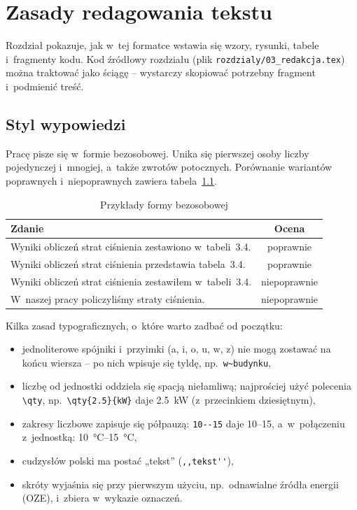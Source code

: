 \chapter{Zasady redagowania tekstu}
\label{chap:redakcja}

Rozdział pokazuje, jak w~tej formatce wstawia się wzory, rysunki, tabele
i~fragmenty kodu. Kod źródłowy rozdziału (plik
\texttt{rozdzialy/03\_redakcja.tex}) można traktować jako ściągę --
wystarczy skopiować potrzebny fragment i~podmienić treść.

\section{Styl wypowiedzi}
\label{sec:styl}

Pracę pisze się w~formie bezosobowej. Unika się pierwszej osoby liczby
pojedynczej i~mnogiej, a~także zwrotów potocznych. Porównanie wariantów
poprawnych i~niepoprawnych zawiera tabela~\ref{tab:styl}.

\begin{table}[htbp]
  \centering
  \caption{Przykłady formy bezosobowej}
  \label{tab:styl}
  \begin{tabularx}{\linewidth}{@{}Xc@{}}
    \toprule
    \textbf{Zdanie} & \textbf{Ocena} \\
    \midrule
    Wyniki obliczeń strat ciśnienia zestawiono w~tabeli~3.4. & poprawnie \\
    Wyniki obliczeń strat ciśnienia przedstawia tabela~3.4.  & poprawnie \\
    Wyniki obliczeń strat ciśnienia zestawiłem w~tabeli~3.4. & niepoprawnie \\
    W~naszej pracy policzyliśmy straty ciśnienia.            & niepoprawnie \\
    \bottomrule
  \end{tabularx}
\end{table}

Kilka zasad typograficznych, o~które warto zadbać od początku:
\begin{itemize}
  \item jednoliterowe spójniki i~przyimki (a, i, o, u, w, z) nie mogą
        zostawać na końcu wiersza -- po nich wpisuje się tyldę, np.\
        \verb|w~budynku|,
  \item liczbę od jednostki oddziela się spacją niełamliwą; najprościej
        użyć polecenia \verb|\qty|, np.\ \verb|\qty{2.5}{kW}| daje
        \qty{2.5}{kW} (z~przecinkiem dziesiętnym),
  \item zakresy liczbowe zapisuje się półpauzą: \verb|10--15| daje 10--15,
        a~w~połączeniu z~jednostką: \qtyrange{10}{15}{\degreeCelsius},
  \item cudzysłów polski ma postać „tekst” (\verb|,,tekst''|),
  \item skróty wyjaśnia się przy pierwszym użyciu, np.\ odnawialne źródła
        energii (OZE), i~zbiera w~wykazie oznaczeń.
\end{itemize}


